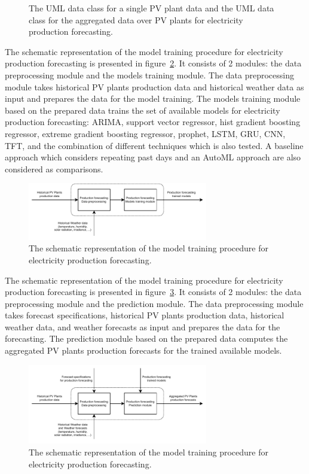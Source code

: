 \begin{figure}[H]
\begin{minipage}[b]{8.5cm}
\subcaption{}
\label{fig:umlproduction}
\end{minipage}
\caption{ The UML data class for a single PV plant data and  the UML data class for the aggregated data over PV plants for electricity production forecasting.}
\end{figure}

The schematic representation of the model training procedure for electricity production forecasting is presented in figure~\ref{fig:modeltrainingproduction}.
It consists of 2 modules: the data preprocessing module and the models training module.
The data preprocessing module takes historical PV plants production data and historical weather data as input and prepares the data for the model training.
The models training module based on the prepared data trains the set of available models for electricity production forecasting: ARIMA, support vector regressor, hist gradient boosting regressor, extreme gradient boosting regressor, prophet, LSTM, GRU, CNN, TFT, and the combination of different techniques which is also tested.
A baseline approach which considers repeating past days and an AutoML approach are also considered as comparisons.

\begin{figure}[H]
\centering
\includegraphics[width=0.7\textwidth]{images/system_model_training_production}
\caption{The schematic representation of the model training procedure for electricity production forecasting.}
\label{fig:modeltrainingproduction}
\end{figure}

The schematic representation of the model training procedure for electricity production forecasting is presented in figure~\ref{fig:modelforecastingproduction}.
It consists of 2 modules: the data preprocessing module and the prediction module.
The data preprocessing module takes forecast specifications, historical PV plants production data, historical weather data, and weather forecasts as input and prepares the data for the forecasting.
The prediction module based on the prepared data computes the aggregated PV plants production forecasts for the trained available models.

\begin{figure}[H]
\centering
\includegraphics[width=0.7\textwidth]{images/system_model_forecasting_production}
\caption{The schematic representation of the model training procedure for electricity production forecasting.}
\label{fig:modelforecastingproduction}
\end{figure}
